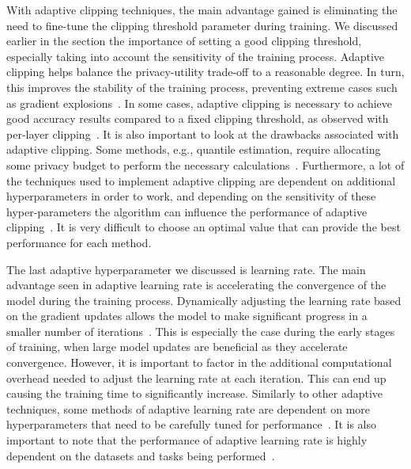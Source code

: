 With adaptive clipping techniques, the main advantage gained is eliminating the need to fine-tune the clipping threshold parameter during training. We discussed earlier in the section the importance of setting a good clipping threshold, especially taking into account the sensitivity of the training process. Adaptive clipping helps balance the privacy-utility trade-off to a reasonable degree. In turn, this improves the stability of the training process, preventing extreme cases such as gradient explosions~\cite{RefWorks:RefID:37-andrewdifferentially}. In some cases, adaptive clipping is necessary to achieve good accuracy results compared to a fixed clipping threshold, as observed with per-layer clipping~\cite{RefWorks:RefID:39-he2022exploring}. It is also important to look at the drawbacks associated with adaptive clipping. Some methods, e.g., quantile estimation, require allocating some privacy budget to perform the necessary calculations~\cite{RefWorks:RefID:37-andrewdifferentially, RefWorks:RefID:39-he2022exploring}. Furthermore, a lot of the techniques used to implement adaptive clipping are dependent on additional hyperparameters in order to work, and depending on the sensitivity of these hyper-parameters the algorithm can influence the performance of adaptive clipping~\cite{RefWorks:RefID:35-pichapati2019adaclip:}. It is very difficult to choose an optimal value that can provide the best performance for each method.

The last adaptive hyperparameter we discussed is learning rate. The main advantage seen in adaptive learning rate is accelerating the convergence of the model during the training process. Dynamically adjusting the learning rate based on the gradient updates allows the model to make significant progress in a smaller number of iterations~\cite{RefWorks:RefID:38-koskelalearning}. This is especially the case during the early stages of training, when large model updates are beneficial as they accelerate convergence. However, it is important to factor in the additional computational overhead needed to adjust the learning rate at each iteration. This can end up causing the training time to significantly increase. Similarly to other adaptive techniques, some methods of adaptive learning rate are dependent on more hyperparameters that need to be carefully tuned for performance~\cite{RefWorks:RefID:38-koskelalearning}. It is also important to note that the performance of adaptive learning rate is highly dependent on the datasets and tasks being performed~\cite{concentrated}.


